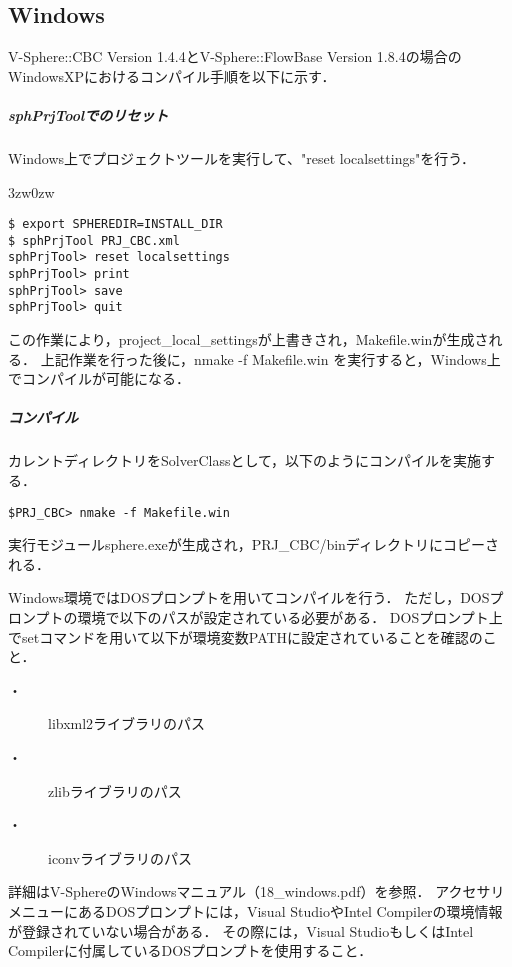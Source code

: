 %
\subsection{Windows}
\label{sec:install_win}
V-Sphere::CBC Version 1.4.4とV-Sphere::FlowBase Version 1.8.4の場合のWindowsXPにおけるコンパイル手順を以下に示す．

\subparagraph{sphPrjToolでのリセット}
Windows上でプロジェクトツールを実行して、"reset localsettings"を行う．

\begin{indentation}{3zw}{0zw}
\small
\begin{verbatim}
$ export SPHEREDIR=INSTALL_DIR
$ sphPrjTool PRJ_CBC.xml
sphPrjTool> reset localsettings
sphPrjTool> print
sphPrjTool> save
sphPrjTool> quit
\end{verbatim}
\end{indentation}

この作業により，project\_local\_settingsが上書きされ，Makefile.winが生成される．
上記作業を行った後に，nmake -f Makefile.win を実行すると，Windows上でコンパイルが可能になる．

\subparagraph{コンパイル}
カレントディレクトリをSolverClassとして，以下のようにコンパイルを実施する．\\
{\small
\begin{verbatim}
$PRJ_CBC> nmake -f Makefile.win
\end{verbatim}
}

実行モジュールsphere.exeが生成され，PRJ\_CBC/binディレクトリにコピーされる．
\vspace{\baselineskip}


Windows環境ではDOSプロンプトを用いてコンパイルを行う．
ただし，DOSプロンプトの環境で以下のパスが設定されている必要がある．
DOSプロンプト上でsetコマンドを用いて以下が環境変数PATHに設定されていることを確認のこと．

\begin{description}
\item[・] libxml2ライブラリのパス
\item[・] zlibライブラリのパス
\item[・] iconvライブラリのパス
\end{description}

\vspace{3mm}

詳細はV-SphereのWindowsマニュアル（18\_windows.pdf）を参照．
アクセサリメニューにあるDOSプロンプトには，Visual StudioやIntel Compilerの環境情報が登録されていない場合がある．
その際には，Visual StudioもしくはIntel Compilerに付属しているDOSプロンプトを使用すること．\\


